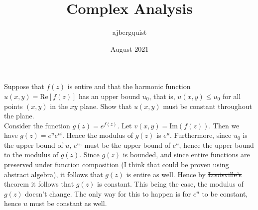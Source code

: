 \documentclass{article}
\title{Complex Analysis}
\author{ajbergquist }
\date{August 2021}
\theoremstyle{definition}
\newcommand{\Re}{\mbox{Re}}
\newcommand{\Im}{\mbox{Im}}
\newcommand{\cs}[1]{\color{blue}{#1}\normalcolor}
\newcommand{\cs}[1]{\color{blue}{#1}\normalcolor}
\begin{document}
\maketitle
{} Suppose that $f(z)$ is entire and that the harmonic function $u(x,y) = \Re[f(z)]$ has an upper bound $u_0$, that is, $u(x,y)\le u_0$ for all points $(x,y)$ in the $xy$ plane. Show that $u(x,y)$ must be constant throughout the plane.\\

 Consider the function $g(z) = e^{f(z)}$. Let $v(x,y) = \Im(f(z))$. Then we have $g(z) = e^{u}e^{vi}$. Hence the modulus of $g(z)$ is $e^{u}$. Furthermore, since $u_0$ is the upper bound of $u$, $e^{u_0}$ must be the upper bound of $e^u$, hence the upper bound to the modulus of $g(z)$. Since $g(z)$ is bounded, and since entire functions are preserved under function composition (I think that could be proven using abstract algebra), it follows that $g(z)$ is entire as well. Hence by \sout{Louisville's} \cs{Liouville's} theorem it follows that $g(z)$ is constant. This being the case, the modulus of $g(z)$ doesn't change. The only way for this to happen is for $e^u$ to be constant, hence $u$ must be constant as well.

\cs{5/5}
\end{document}
